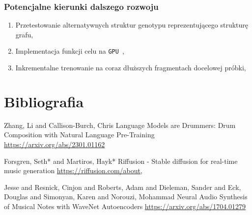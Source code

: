 \documentclass[]{beamer}
\begin{document}


\begin{frame}
  \frametitle{Potencjalne kierunki dalszego rozwoju}

  \begin{enumerate}
    \item Przetestowanie alternatywnych struktur genotypu reprezentującego strukturę grafu,
    \item Implementacja funkcji celu na \texttt{GPU}~\cite{gpu_fft},
    \item Inkrementalne trenowanie na coraz dłuższych fragmentach docelowej próbki,
  \end{enumerate}
\end{frame}



\section{Bibliografia}

\begin{frame}
  \begin{thebibliography}{99} %

   Zhang, Li and Callison-Burch, Chris
  \newblock Language Models are Drummers: Drum Composition with Natural Language Pre-Training
  \newblock \url{https://arxiv.org/abs/2301.01162}

   Forsgren, Seth* and Martiros, Hayk*
  \newblock Riffusion - Stable diffusion for real-time music generation
  \newblock \url{https://riffusion.com/about},

   Jesse and Resnick, Cinjon and Roberts, Adam and Dieleman, Sander and Eck, Douglas and Simonyan, Karen and Norouzi, Mohammad
  \newblock Neural Audio Synthesis of Musical Notes with WaveNet Autoencoders
  \newblock \url{https://arxiv.org/abs/1704.01279}

  \end{thebibliography}
\end{frame}
\end{document}
